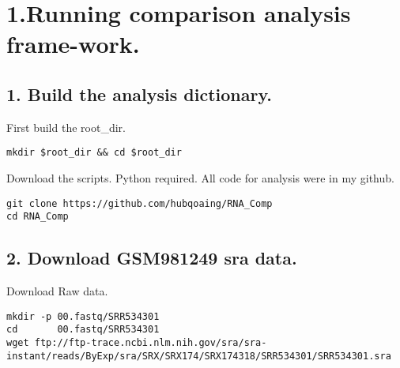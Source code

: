 \section{1.Running comparison analysis frame-work. } 
\subsection{1. Build the analysis dictionary.}
\begin{frame}[c,fragile]
	\begin{block}{ First build the root\_dir. }
		\begin{lstlisting}
mkdir $root_dir && cd $root_dir
		\end{lstlisting}
	\end{block}
	\pause
	\begin{block}{ Download the scripts. Python required.}
		All code for analysis were in my github.
		\begin{lstlisting}
git clone https://github.com/hubqoaing/RNA_Comp
cd RNA_Comp
		\end{lstlisting}
	\end{block}
\end{frame}

\subsection{2. Download GSM981249 sra data.}
\begin{frame}[c,fragile]
	\begin{block}{ Download Raw data. }
		\begin{lstlisting}
mkdir -p 00.fastq/SRR534301
cd       00.fastq/SRR534301
wget ftp://ftp-trace.ncbi.nlm.nih.gov/sra/sra-instant/reads/ByExp/sra/SRX/SRX174/SRX174318/SRR534301/SRR534301.sra
		\end{lstlisting}
	\end{block}
\end{frame}

